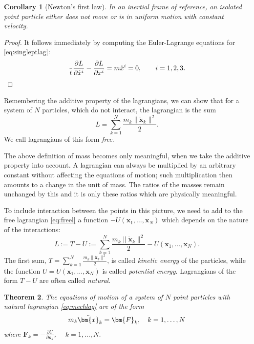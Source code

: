 \documentclass[english,fontsize=11pt,paper=a5,oneside]{scrbook}
\newcommand{\bx}{\bm{x}}
\let\d\relax
\newcommand{\d}{\mathrm{d}}
\newtheorem{theorem}{Theorem}[chapter]
\newtheorem{corollary}[theorem]{Corollary}
\theoremstyle{definition}
\newenvironment{remark}
  {\pushQED{\qed}\renewcommand{\qedsymbol}{$\lozenge$}\remarkx}
  {\popQED\endremarkx}
\begin{document}
\begin{corollary}[Newton's first law]
  In an inertial frame of reference, an isolated point particle either does not move or is in uniform motion with constant velocity.
\end{corollary}
\begin{proof}
  It follows immediately by computing the Euler-Lagrange equations for \eqref{eq:singleptlag}:
  \begin{equation}
    \frac{\d}{\d t} \frac{\partial L}{\partial \dot x^i} - \frac{\partial L}{\partial x^i} = m \ddot x^i = 0, \qquad i=1,2,3.
  \end{equation}
\end{proof}

Remembering the additive property of the lagrangians, we can show that for a system of $N$ particles, which do not interact, the lagrangian is the sum
\begin{equation}\label{eq:freel}
  L = \sum_{k=1}^N \frac{m_k \|\dot{\bx}_k\|^2}{2}.
\end{equation}
We call lagrangians of this form \emph{free}.

\begin{remark}
  The above definition of mass becomes only meaningful, when we take the additive property into account.
  A lagrangian can always be multiplied by an arbitrary constant without affecting the equations of motion;
  such multiplication then amounts to a change in the unit of mass.
  The ratios of the masses remain unchanged by this and it is only these ratios which are physically meaningful.
\end{remark}

To include interaction between the points in this picture, we need to add to the free lagrangian \eqref{eq:freel} a function $-U(\bx_1, \ldots, \bx_N)$ which depends on the nature of the interactions:
\begin{equation}\label{eq:mechlag}
  L := T-U := \sum_{k=1}^N \frac{m_k \|\dot{\bx}_k\|^2}{2} -U(\bx_1, \ldots, \bx_N).
\end{equation}
The first sum, $T = \sum_{k=1}^N \frac{m_k \|\dot{\bx}_k\|^2}{2}$, is called \emph{kinetic energy} of the particles, while the function $U = U(\bx_1, \ldots, \bx_N)$ is called \emph{potential energy}. Lagrangians of the form $T-U$ are often called \emph{natural}.

\begin{theorem}
  The equations of motion of a system of $N$ point particles with natural lagrangian \eqref{eq:mechlag} are of the form
  \begin{equation}\label{eq:newton2}
    m_k \ddot\bx_k = \bm{F}_k, \quad k=1,\ldots,N
  \end{equation}
  where $\bm{F}_k = -\frac{\partial U}{\partial \bm{x}_k}$, $\quad k=1,\ldots,N$.
\end{theorem}
\end{document}
